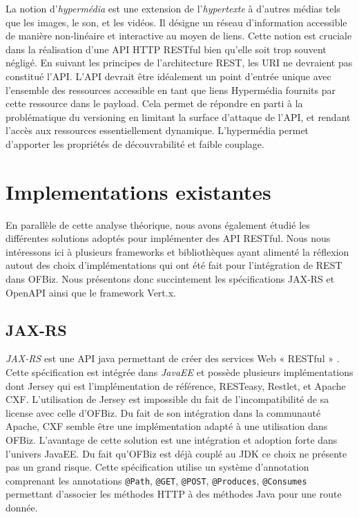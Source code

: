 \documentclass[a4paper, 11pt]{report}
\begin{document}
La notion d'\emph{hypermédia} est une extension de l'\emph{hypertexte}
à d'autres médias tels que les images, le son, et les vidéos. Il
désigne un réseau d'information accessible de manière non-linéaire et
interactive au moyen de liens. Cette notion est cruciale dans la
réalisation d'une API HTTP RESTful bien qu'elle soit trop souvent
négligé. En suivant les principes de l'architecture REST, les URI ne
devraient pas constitué l'API. L'API devrait être idéalement un point
d'entrée unique avec l'ensemble des ressources accessible en tant que
liens Hypermédia fournits par cette ressource dans le payload. Cela
permet de répondre en parti à la problématique du versioning en
limitant la surface d'attaque de l'API, et rendant l'accès aux
ressources essentiellement dynamique. L'hypermédia permet d'apporter
les propriétés de découvrabilité et faible couplage.

\section{Implementations existantes}

En parallèle de cette analyse théorique, nous avons également étudié
les différentes solutions adoptés pour implémenter des API RESTful.
Nous nous intéressons ici à plusieurs frameworks et bibliothèques
ayant alimenté la réflexion autout des choix d'implémentations qui ont
été fait pour l'intégration de REST dans OFBiz. Nous présentons donc
succintement les spécifications JAX-RS et OpenAPI ainsi que le
framework Vert.x.

\subsection{JAX-RS}

\emph{JAX-RS} est une API java permettant de créer des services Web «
RESTful » \cite{pericas2013jax}. Cette spécification est intégrée dans
\emph{JavaEE} et possède plusieurs implémentations dont Jersey qui est
l'implémentation de référence, RESTeasy, Restlet, et Apache CXF.
L'utilisation de Jersey est impossible du fait de l'incompatibilité de
sa license avec celle d'OFBiz. Du fait de son intégration dans la
communauté Apache, CXF semble être une implémentation adapté à une
utilisation dans OFBiz. L'avantage de cette solution est une
intégration et adoption forte dans l'univers JavaEE. Du fait qu'OFBiz
est déjà couplé au JDK ce choix ne présente pas un grand risque. Cette
spécification utilise un système d'annotation comprenant les
annotations \verb=@Path=, \verb=@GET=, \verb=@POST=, \verb=@Produces=,
\verb=@Consumes= permettant d'associer les méthodes HTTP à des
méthodes Java pour une route donnée.
\end{document}
